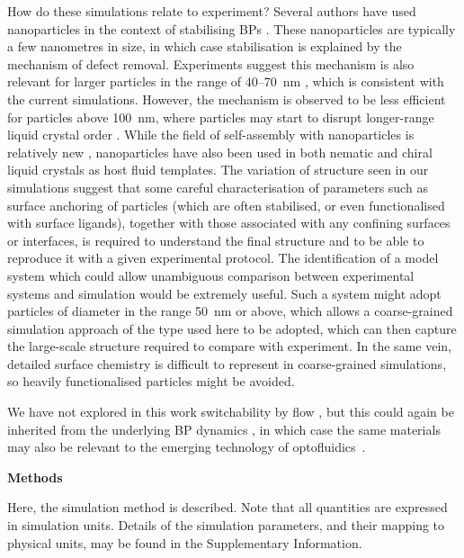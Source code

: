\documentclass[12pt]{article}
\begin{document}
How do these simulations relate to experiment? Several authors have
used nanoparticles in the context of stabilising BPs
\cite{yoshida2009,karatairi}. These
nanoparticles are typically a few nanometres in size, in which case
stabilisation is explained by the mechanism of defect removal.
Experiments suggest this mechanism is also
relevant for larger particles in the range of 40--70~nm 
\cite{dierking}, which is consistent with the current simulations.
However, the mechanism is observed to be less efficient for
particles above 100~nm, where particles may start to disrupt
longer-range liquid crystal order \cite{dierking}. While the field of
self-assembly with nanoparticles is relatively new \cite{draper},
nanoparticles have also been used in both nematic \cite{milette2012}
and chiral liquid crystals \cite{cordoyiannis} as host fluid templates.
The variation of structure seen
in our simulations suggest that some careful characterisation of parameters
such as surface anchoring of particles (which are often stabilised, or even
functionalised with surface ligands), together with those associated
with any confining surfaces or interfaces, is required to understand the
final structure and to be able to reproduce it with a given experimental
protocol. The identification of a model system which could allow
unambiguous comparison between experimental systems and simulation
would be extremely useful. Such a system might adopt particles of
diameter in the range 50~nm or above, which allows a coarse-grained simulation
approach of the type used here to be adopted, which can then capture the
large-scale structure required to compare with experiment. In the same vein,
detailed surface chemistry is difficult to represent in coarse-grained
simulations, so heavily functionalised particles might be avoided.


We have not explored in this work switchability by flow \cite{flowswitch}, but this could again be inherited from the underlying BP dynamics \cite{adriano,permeation2}, in which case the same materials may also be relevant to the emerging technology of optofluidics~\cite{optofluidics}.


\bigskip
\noindent
\textbf{\large Methods}

Here, the simulation method is described. Note that
all quantities are expressed in simulation units. Details
of the simulation parameters, and their mapping to physical units,
may be found in the Supplementary Information.
\end{document}
